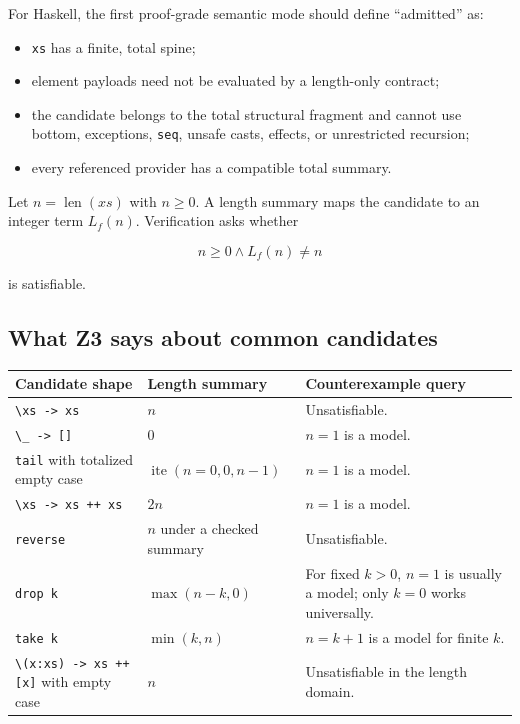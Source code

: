 \documentclass[11pt,oneside]{article}
\newcommand{\code}[1]{\texttt{#1}}
\begin{document}
For Haskell, the first proof-grade semantic mode should define ``admitted'' as:

\begin{itemize}
  \item \code{xs} has a finite, total spine;
  \item element payloads need not be evaluated by a length-only contract;
  \item the candidate belongs to the total structural fragment and cannot use bottom,
        exceptions, \code{seq}, unsafe casts, effects, or unrestricted recursion;
  \item every referenced provider has a compatible total summary.
\end{itemize}

Let $n=\operatorname{len}(xs)$ with $n\geq0$. A length summary maps the candidate to an
integer term $L_f(n)$. Verification asks whether

\[
  n\geq0 \land L_f(n)\neq n
\]

is satisfiable.

\subsection{What Z3 says about common candidates}

\begin{longtable}{@{}p{}p{}p{}@{}}
\toprule
\textbf{Candidate shape} & \textbf{Length summary} & \textbf{Counterexample query} \\
\midrule
\endhead
\code{\textbackslash xs -> xs} & $n$ & Unsatisfiable. \\
\code{\textbackslash \_ -> []} & $0$ & $n=1$ is a model. \\
\code{tail} with totalized empty case & $\operatorname{ite}(n=0,0,n-1)$ & $n=1$ is a model. \\
\code{\textbackslash xs -> xs ++ xs} & $2n$ & $n=1$ is a model. \\
\code{reverse} & $n$ under a checked summary & Unsatisfiable. \\
\code{drop k} & $\max(n-k,0)$ & For fixed $k>0$, $n=1$ is usually a model; only $k=0$ works universally. \\
\code{take k} & $\min(k,n)$ & $n=k+1$ is a model for finite $k$. \\
\code{\textbackslash (x:xs) -> xs ++ [x]} with empty case & $n$ & Unsatisfiable in the length domain. \\
\bottomrule
\end{longtable}
\end{document}
